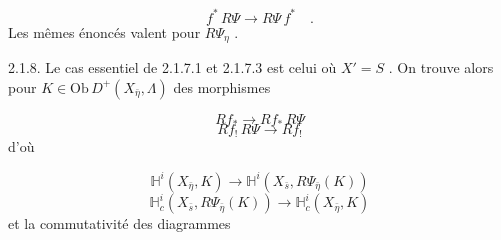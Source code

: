 \begin{equation}\tag{2.1.7.5}
f^* \, R\Psi \longrightarrow R\Psi \, f^* \quad .
\end{equation}
Les mêmes énoncés valent pour $R\Psi_\eta$ .

2.1.8. Le cas essentiel de 2.1.7.1 et 2.1.7.3 est celui où $X' = S$ . On trouve alors pour $K \in \mathrm{Ob}\, D^+(X_{\bar{\eta}} , \Lambda)$ des morphismes

\begin{equation}\tag{2.1.8.1}
Rf_* \longrightarrow Rf_* \, R\Psi
\end{equation}
\begin{equation}\tag{2.1.8.2}
Rf_! \, R\Psi \longrightarrow Rf_!
\end{equation}
d'où

\begin{equation}\tag{2.1.8.3}
\mathbb{H}^i(X_{\bar{\eta}}, K) \longrightarrow \mathbb{H}^i(X_{\bar{s}}, R\Psi_{\bar{\eta}}(K))
\end{equation}
\begin{equation}\tag{2.1.8.4}
\mathbb{H}^i_c(X_{\bar{s}}, R\Psi_{\bar{\eta}}(K)) \longrightarrow \mathbb{H}^i_c(X_{\bar{\eta}}, K)
\end{equation}
et la commutativité des diagrammes 



